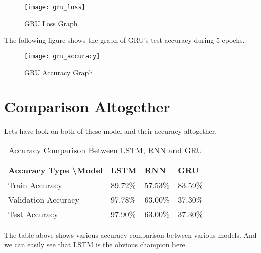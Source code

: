 		\begin{figure}[H]
			\centering
			\texttt{[image: gru\_loss]}
			\caption{GRU Loss Graph}
		\end{figure}
		\vline
		
		The following figure shows the graph of GRU's test accuracy during 5 epochs.\\
		\begin{figure}[H]
			\centering
			\texttt{[image: gru\_accuracy]}
			\caption{GRU Accuracy Graph}
		\end{figure}
		\vline
		
	
	\section{Comparison Altogether}
	Lets have look on both of these model and their accuracy altogether. \\
	
	\begin{table}[H]
		\centering
		\begin{tabular}{|l|l|l|l|}
			\hline
			Accuracy Type \textbackslash Model & LSTM    & RNN     & GRU     \\ \hline
			Train Accuracy                     & 89.72\% & 57.53\% & 83.59\% \\ \hline
			Validation Accuracy                & 97.78\% & 63.00\% & 37.30\% \\ \hline
			Test Accuracy                      & 97.90\% & 63.00\% & 37.30\% \\ \hline
		\end{tabular}
		\caption{Accuracy Comparison Between LSTM, RNN and GRU}
	\end{table}
	
	The table above shows various accuracy comparison between various models. And we can easily see that LSTM is the obvious champion here.